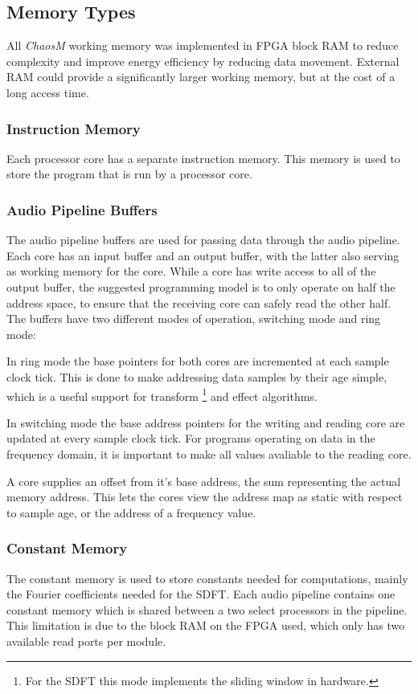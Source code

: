 
\subsection{Memory Types}\label{subsec:fpga-memory}

All \textit{ChaosM} working memory was implemented in FPGA block RAM to reduce complexity
and improve energy efficiency by reducing data movement. External RAM could
provide a significantly larger working memory, but at the cost of a long access time.

\subsubsection{Instruction Memory}
Each processor core has a separate instruction memory. This memory is used to
store the program that is run by a processor core.

\subsubsection{Audio Pipeline Buffers}
The audio pipeline buffers are used for passing data through the audio pipeline.
Each core has an input buffer and an output buffer, with the latter also serving
as working memory for the core. While a core has write access to all of the 
output buffer, the suggested programming model is to only operate on half the
address space, to ensure that the receiving core can safely read the other half.
The buffers have two different modes of operation, switching mode and ring mode:

In ring mode the base pointers for both cores are incremented at each sample
clock tick. This is done to make addressing data samples by their age simple,
which is a useful support for transform \footnote{For the SDFT this mode implements the sliding window in hardware.} and effect algorithms.

In switching mode the base address pointers for the writing and reading core are
updated at every sample clock tick. For programs operating on data in the
frequency domain, it is important to make all values avaliable to the reading core.

A core supplies an offset from it's base address, the sum representing the
actual memory address. This lets the cores view the address map as static with
respect to sample age, or the address of a frequency value.


\subsubsection{Constant Memory}
The constant memory is used to store constants needed for computations, mainly
the Fourier coefficients needed for the SDFT. Each audio pipeline contains one
constant memory which is shared between a two select processors in the
pipeline. This limitation is due to the block RAM on the FPGA used, which only 
has two available read ports per module.

